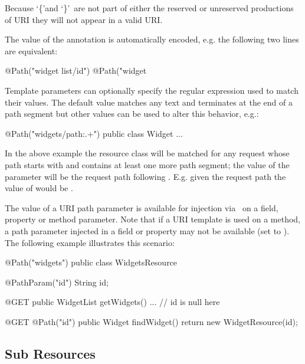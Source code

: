 \begin{nnnote}Because \lq\{\rq and \lq\}\rq\ are not part of either the reserved or unreserved productions of URI\cite{uri} they will not appear in a valid URI.\end{nnnote}

The value of the annotation is automatically encoded, e.g. the following two lines are equivalent:

\begin{listing}{1}
@Path("widget list/{id}")
@Path("widget%
\end{listing}

Template parameters can optionally specify the regular expression used to match their values. The default value matches any text and terminates at the end of a path segment but other values can be used to alter this behavior, e.g.:

\begin{listing}{1}
@Path("widgets/{path:.+}")
public class Widget {
  ...
}\end{listing}

In the above example the  resource class will be matched for any request whose path starts with  and contains at least one more path segment; the value of the  parameter will be the request path following . E.g. given the request path  the value of  would be .

The value of a URI path parameter is available for injection via \PathParam\ on a field, property or method parameter. Note that if a URI template is used on a method, a path parameter injected in a field or property may not be available (set to ). The following example illustrates this scenario:

\begin{listing}{1}
@Path("widgets")
public class WidgetsResource {
  @PathParam("id") String id;
  
  @GET
  public WidgetList getWidgets() {
    ...     // id is null here
  }
  
  @GET
  @Path("{id}")
  public Widget findWidget() {
    return new WidgetResource(id);
  }
}\end{listing}

\subsection{Sub Resources}
\label{sub_resources}


